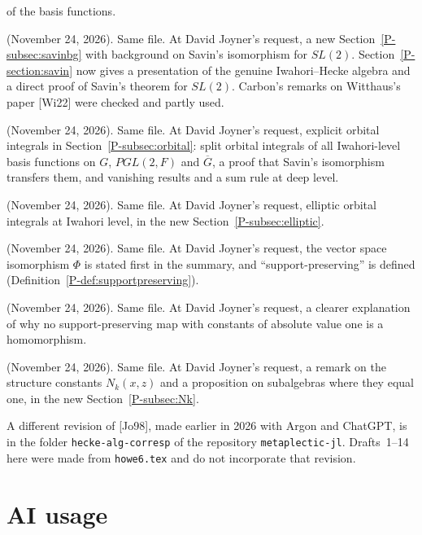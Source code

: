 \documentclass[12pt,letterpaper]{amsart}
\newcommand{\Gbar}{\overline{G}}
\begin{document}
\begin{description}[leftmargin=1.5em,style=nextline]
of the basis functions.
\item[Draft 9] (November 24, 2026). Same file. At David Joyner's
request, a new Section~\ref{P-subsec:savinbg} with background on
Savin's isomorphism for $SL(2)$. Section~\ref{P-section:savin} now
gives a presentation of the genuine Iwahori--Hecke algebra and a
direct proof of Savin's theorem for $SL(2)$. Carbon's remarks on
Witthaus's paper [Wi22] were checked and partly used.
\item[Draft 10] (November 24, 2026). Same file. At David Joyner's
request, explicit orbital integrals in Section~\ref{P-subsec:orbital}:
split orbital integrals of all Iwahori-level basis functions on $G$,
$PGL(2,F)$ and $\Gbar$, a proof that Savin's isomorphism transfers
them, and vanishing results and a sum rule at deep level.
\item[Draft 11] (November 24, 2026). Same file. At David Joyner's
request, elliptic orbital integrals at Iwahori level, in the new
Section~\ref{P-subsec:elliptic}.
\item[Draft 12] (November 24, 2026). Same file. At David Joyner's
request, the vector space isomorphism $\Phi$ is stated first in the
summary, and ``support-preserving'' is defined
(Definition~\ref{P-def:supportpreserving}).
\item[Draft 13] (November 24, 2026). Same file. At David Joyner's
request, a clearer explanation of why no support-preserving map with
constants of absolute value one is a homomorphism.
\item[Draft 14] (November 24, 2026). Same file. At David Joyner's
request, a remark on the structure constants $N_k(x,z)$ and a
proposition on subalgebras where they equal one, in the new
Section~\ref{P-subsec:Nk}.
\end{description}

\noindent
A different revision of [Jo98], made earlier in 2026 with Argon and
ChatGPT, is in the folder \texttt{hecke-alg-corresp} of the repository
\texttt{metaplectic-jl}. Drafts~1--14 here were made from
\texttt{howe6.tex} and do not incorporate that revision.

\section{AI usage}
\end{document}
